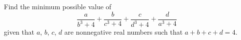 Find the minimum possible value of \[\frac{a}{b^3+4}+\frac{b}{c^3+4}+\frac{c}{d^3+4}+\frac{d}{a^3+4}\] given that $a$, $b$, $c$, $d$ are nonnegative real numbers such that $a+b+c+d=4$.